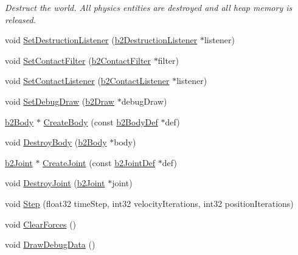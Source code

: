 \begin{DoxyCompactItemize}
\begin{DoxyCompactList}\small\item\em Destruct the world. All physics entities are destroyed and all heap memory is released. \end{DoxyCompactList}\item 
void \hyperlink{classb2_world_ae377f2dd5512ada7d27f4ad3541c75bf}{Set\-Destruction\-Listener} (\hyperlink{classb2_destruction_listener}{b2\-Destruction\-Listener} $\ast$listener)
\item 
void \hyperlink{classb2_world_a85e6e1e911c7d6366f8c7d57a12b72ff}{Set\-Contact\-Filter} (\hyperlink{classb2_contact_filter}{b2\-Contact\-Filter} $\ast$filter)
\item 
void \hyperlink{classb2_world_a614549967fb8a1584b61c11e2d553d42}{Set\-Contact\-Listener} (\hyperlink{classb2_contact_listener}{b2\-Contact\-Listener} $\ast$listener)
\item 
void \hyperlink{classb2_world_a6976d2c67400df03c0d44174ffcfb7ee}{Set\-Debug\-Draw} (\hyperlink{classb2_draw}{b2\-Draw} $\ast$debug\-Draw)
\item 
\hyperlink{classb2_body}{b2\-Body} $\ast$ \hyperlink{classb2_world_a2eb36e967e43294bfa03ec3d177c2dae}{Create\-Body} (const \hyperlink{structb2_body_def}{b2\-Body\-Def} $\ast$def)
\item 
void \hyperlink{classb2_world_ad52231ad7a9556ef5735ac79cbcd8fcf}{Destroy\-Body} (\hyperlink{classb2_body}{b2\-Body} $\ast$body)
\item 
\hyperlink{classb2_joint}{b2\-Joint} $\ast$ \hyperlink{classb2_world_a5cba9d0653149eb62504154e6fb35021}{Create\-Joint} (const \hyperlink{structb2_joint_def}{b2\-Joint\-Def} $\ast$def)
\item 
void \hyperlink{classb2_world_add5942aef171e54cfa384c8975746dca}{Destroy\-Joint} (\hyperlink{classb2_joint}{b2\-Joint} $\ast$joint)
\item 
void \hyperlink{classb2_world_a7a8eff61af98461f978fe43f3af7be90}{Step} (float32 time\-Step, int32 velocity\-Iterations, int32 position\-Iterations)
\item 
void \hyperlink{classb2_world_ac082ab4c4ad0b1c5ec4674315eeec643}{Clear\-Forces} ()
\item 
\hypertarget{classb2_world_a293d9865e407fd463e168b0a29856acc}{void \hyperlink{classb2_world_a293d9865e407fd463e168b0a29856acc}{Draw\-Debug\-Data} ()}\label{classb2_world_a293d9865e407fd463e168b0a29856acc}


\end{DoxyCompactItemize}
